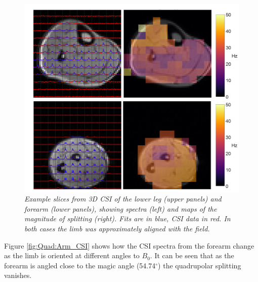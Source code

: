 
\begin{figure}
    \centering
    \includegraphics[width=1\textwidth]{Figures/Quad/Calf_Arm_CSI.png}
    \caption{\textit{Example slices from 3D \ac{CSI} of the lower leg (upper panels) and forearm (lower panels), showing spectra (left) and maps of the magnitude of splitting (right). Fits are in blue, CSI data in red. In both cases the limb was approximately aligned with the field.}}
    \label{fig:Quad:Calf_Arm_CSI}
\end{figure}

Figure \ref{fig:Quad:Arm_CSI} shows how the \ac{CSI} spectra from the forearm change as the limb is oriented at different angles to $B_0$. It can be seen that as the forearm is angled close to the magic angle (54.74$^\circ$) the quadrupolar splitting vanishes. 

